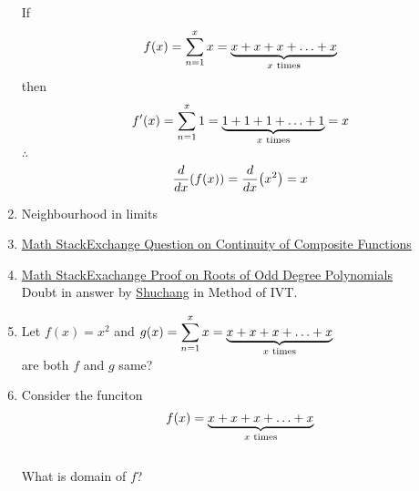 \documentclass{article}
\begin{document}
\begin{enumerate}
          If $$f(x)=\displaystyle\sum_{n=1}^{x} x=\underbrace{x+x+x+\ldots +x}_{x \hspace{1mm} \text{times}}$$
          then $$f'(x)=\displaystyle\sum_{n=1}^{x} 1=\underbrace{1+1+1+\ldots+1}_{x \hspace{1mm} \text{times}}=x$$
          $\therefore$ $$\dv{x}(f(x))=\dv{x}(x^2)=x$$
    \item Neighbourhood in limits
    \item \href{https://math.stackexchange.com/questions/4892287/is-this-result-on-continuity-of-composite-functions-true}{Math StackExchange Question on Continuity of Composite Functions}
    \item \href{https://math.stackexchange.com/questions/689575/proof-that-every-polynomial-of-odd-degree-has-one-real-root}{Math StackExachange Proof on Roots of Odd Degree Polynomials } \\ Doubt in answer by  \href{https://math.stackexchange.com/users/91982/shuchang}{Shuchang} in Method of IVT.
    \item Let $f(x)=x^2$ and $g(x)=\displaystyle\sum_{n=1}^{x}x=\underbrace{x+x+x+\ldots +x}_{x \hspace{1mm} \text{times}}$
          \\ are both $f$ and $g$ same?
    \item Consider the funciton $$f(x)=\underbrace{x+x+x+\ldots+x}_{x \hspace{1mm} \text{times}}$$ \\
          What is domain of $f$?
\end{enumerate}
\end{document}
